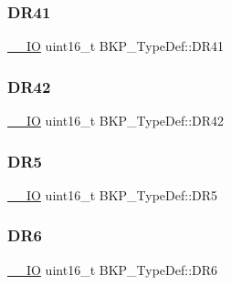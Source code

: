 \mbox{\label{struct_b_k_p___type_def_a9e9b72b388e2ed718df333cfb9e90226}} 
\subsubsection{\texorpdfstring{DR41}{DR41}}
{\footnotesize\ttfamily \mbox{\hyperlink{group___c_m_s_i_s___c_m3__core__definitions_gaec43007d9998a0a0e01faede4133d6be}{\+\_\+\+\_\+\+IO}} uint16\+\_\+t B\+K\+P\+\_\+\+Type\+Def\+::\+D\+R41}

\mbox{\label{struct_b_k_p___type_def_af7a01e3a3e1be76ebb8100e7ff6de9c0}} 
\subsubsection{\texorpdfstring{DR42}{DR42}}
{\footnotesize\ttfamily \mbox{\hyperlink{group___c_m_s_i_s___c_m3__core__definitions_gaec43007d9998a0a0e01faede4133d6be}{\+\_\+\+\_\+\+IO}} uint16\+\_\+t B\+K\+P\+\_\+\+Type\+Def\+::\+D\+R42}

\mbox{\label{struct_b_k_p___type_def_a35b107064600b60af1c42a5e5a6a16c1}} 
\subsubsection{\texorpdfstring{DR5}{DR5}}
{\footnotesize\ttfamily \mbox{\hyperlink{group___c_m_s_i_s___c_m3__core__definitions_gaec43007d9998a0a0e01faede4133d6be}{\+\_\+\+\_\+\+IO}} uint16\+\_\+t B\+K\+P\+\_\+\+Type\+Def\+::\+D\+R5}

\mbox{\label{struct_b_k_p___type_def_a127b4555819656767655092cf43a4ae9}} 
\subsubsection{\texorpdfstring{DR6}{DR6}}
{\footnotesize\ttfamily \mbox{\hyperlink{group___c_m_s_i_s___c_m3__core__definitions_gaec43007d9998a0a0e01faede4133d6be}{\+\_\+\+\_\+\+IO}} uint16\+\_\+t B\+K\+P\+\_\+\+Type\+Def\+::\+D\+R6}

